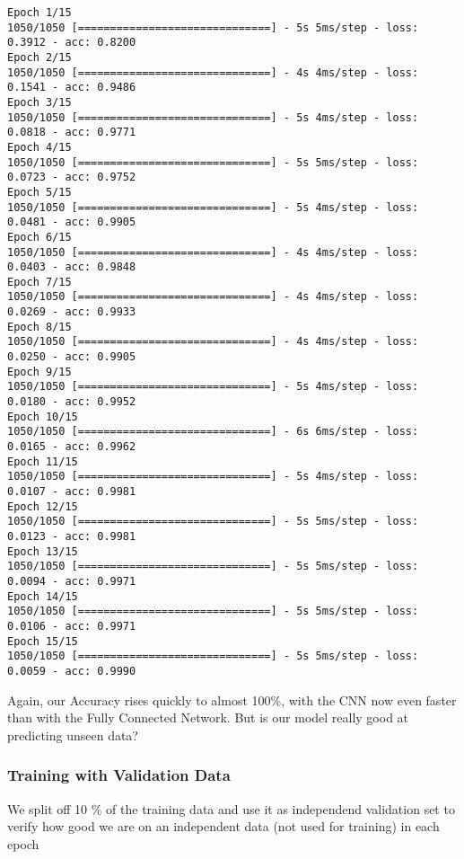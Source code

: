 \documentclass[11pt]{article}
\begin{document}
    \begin{Verbatim}[commandchars=\\\{\}]
Epoch 1/15
1050/1050 [==============================] - 5s 5ms/step - loss: 0.3912 - acc: 0.8200
Epoch 2/15
1050/1050 [==============================] - 4s 4ms/step - loss: 0.1541 - acc: 0.9486
Epoch 3/15
1050/1050 [==============================] - 5s 4ms/step - loss: 0.0818 - acc: 0.9771
Epoch 4/15
1050/1050 [==============================] - 5s 5ms/step - loss: 0.0723 - acc: 0.9752
Epoch 5/15
1050/1050 [==============================] - 5s 4ms/step - loss: 0.0481 - acc: 0.9905
Epoch 6/15
1050/1050 [==============================] - 4s 4ms/step - loss: 0.0403 - acc: 0.9848
Epoch 7/15
1050/1050 [==============================] - 4s 4ms/step - loss: 0.0269 - acc: 0.9933
Epoch 8/15
1050/1050 [==============================] - 4s 4ms/step - loss: 0.0250 - acc: 0.9905
Epoch 9/15
1050/1050 [==============================] - 5s 4ms/step - loss: 0.0180 - acc: 0.9952
Epoch 10/15
1050/1050 [==============================] - 6s 6ms/step - loss: 0.0165 - acc: 0.9962
Epoch 11/15
1050/1050 [==============================] - 5s 4ms/step - loss: 0.0107 - acc: 0.9981
Epoch 12/15
1050/1050 [==============================] - 5s 5ms/step - loss: 0.0123 - acc: 0.9981
Epoch 13/15
1050/1050 [==============================] - 5s 5ms/step - loss: 0.0094 - acc: 0.9971
Epoch 14/15
1050/1050 [==============================] - 5s 5ms/step - loss: 0.0106 - acc: 0.9971
Epoch 15/15
1050/1050 [==============================] - 5s 5ms/step - loss: 0.0059 - acc: 0.9990

    \end{Verbatim}

    Again, our Accuracy rises quickly to almost 100\%, with the CNN now even
faster than with the Fully Connected Network. But is our model really
good at predicting unseen data?

    \subsubsection{Training with Validation
Data}\label{training-with-validation-data}

We split off 10 \% of the training data and use it as independend
validation set to verify how good we are on an independent data (not
used for training) in each epoch
\end{document}
